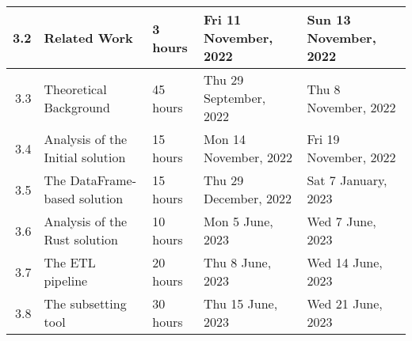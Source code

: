 \documentclass{standalone}
\begin{document}
\begin{tabular}{|r|llll|}
    3.2                                                           & \multicolumn{1}{l|}{Related Work}                               & \multicolumn{1}{l|}{3 hours}                                   & \multicolumn{1}{l|}{Fri 11 November, 2022}                  & Sun 13 November, 2022                                        \\ \hline
    3.3                                                           & \multicolumn{1}{l|}{Theoretical Background}                     & \multicolumn{1}{l|}{45 hours}                                  & \multicolumn{1}{l|}{Thu 29 September, 2022}                 & Thu 8 November, 2022                                         \\ \hline
    3.4                                                           & \multicolumn{1}{l|}{Analysis of the Initial solution}           & \multicolumn{1}{l|}{15 hours}                                  & \multicolumn{1}{l|}{Mon 14 November, 2022}                  & Fri 19 November, 2022                                        \\ \hline
    3.5                                                           & \multicolumn{1}{l|}{The DataFrame-based solution}               & \multicolumn{1}{l|}{15 hours}                                  & \multicolumn{1}{l|}{Thu 29 December, 2022}                  & Sat 7 January, 2023                                          \\ \hline
    3.6                                                           & \multicolumn{1}{l|}{Analysis of the Rust solution}              & \multicolumn{1}{l|}{10 hours}                                  & \multicolumn{1}{l|}{Mon 5 June, 2023}                       & Wed 7 June, 2023                                             \\ \hline
    3.7                                                           & \multicolumn{1}{l|}{The ETL pipeline}                           & \multicolumn{1}{l|}{20 hours}                                  & \multicolumn{1}{l|}{Thu 8 June, 2023}                       & Wed  14 June, 2023                                           \\ \hline
    3.8                                                           & \multicolumn{1}{l|}{The subsetting tool}                        & \multicolumn{1}{l|}{30 hours}                                  & \multicolumn{1}{l|}{Thu 15 June, 2023}                      & Wed 21 June, 2023                                            \\ \hline

\end{tabular}
\end{document}
